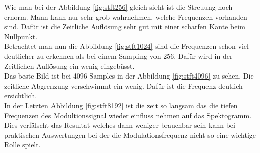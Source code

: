 Wie man bei der Abbildung \ref{fig:stft256} gleich sieht ist die Streuung noch ernorm. Mann kann nur sehr grob wahrnehmen, welche Frequenzen vorhanden sind. Dafür ist die Zeitliche Auflösung sehr gut mit einer scharfen Kante beim Nullpunkt. \\

Betrachtet man nun die Abbildung \ref{fig:stft1024} sind die Frequenzen schon viel deutlicher zu erkennen als bei einem Sampling von 256. Dafür wird in der Zeitlichen Auflösung ein wenig eingebüsst.\\

Das beste Bild ist bei 4096 Samples in der Abbildung \ref{fig:stft4096} zu sehen. Die zeitliche Abgrenzung verschwimmt ein wenig. Dafür ist die Frequenz deutlich ersichtlich.\\

In der Letzten Abbildung \ref{fig:stft8192} ist die zeit so langsam das die tiefen Frequenzen des Modultionssignal wieder einfluss nehmen auf das Spektogramm. Dies verfälscht das Resultat welches dann weniger brauchbar sein kann bei praktischen Auswertungen bei der die Modulationsfrequenz nicht so eine wichtige Rolle spielt.\\






